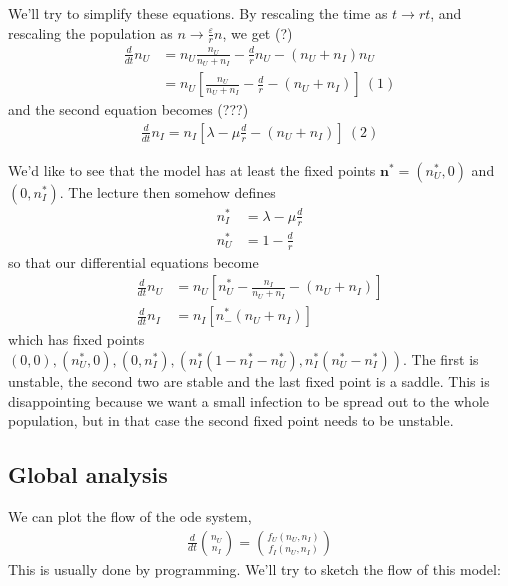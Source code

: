 \documentclass[a4paper]{article}
\begin{document}
We'll try to simplify these equations. By rescaling the time as $t \to rt$, and rescaling the population as $n \to \frac{\varepsilon}{r} n$, we get (?)
\begin{equation*}
\begin{aligned}
\frac{d}{dt} n_U &= n_U \frac{n_U}{n_U + n_I} - \frac{d}{r} n_U - (n_U+n_I) n_U\\
&= n_U\left[\frac{n_U}{n_U+n_I} - \frac{d}{r} - (n_U+n_I)\right] \ (1)
\end{aligned}
\end{equation*}
and the second equation becomes (???)
\begin{equation*}
\begin{aligned}
\frac{d}{dt} n_I = n_I \left[\lambda - \mu \frac{d}{r} - (n_U+n_I)\right] \ (2)
\end{aligned}
\end{equation*}

We'd like to see that the model has at least the fixed points $\mathbf{n}^* = (n^*_U,0)$ and $(0,n^*_I)$. The lecture then somehow defines
\begin{equation*}
\begin{aligned}
n^*_I &= \lambda - \mu \frac{d}{r}\\
n^*_U &= 1-\frac{d}{r}
\end{aligned}
\end{equation*}
so that our differential equations become
\begin{equation*}
\begin{aligned}
\frac{d}{dt} n_U &= n_U \left[n^*_U - \frac{n_I}{n_U+n_I} - (n_U+n_I)\right]\\
\frac{d}{dt} n_I &= n_I \left[n^*_ - (n_U+n_I)\right]
\end{aligned}
\end{equation*}
which has fixed points $(0,0),(n^*_U,0),(0,n^*_I),(n^*_I(1-n^*_I-n^*_U),n^*_I(n^*_U-n^*_I))$. The first is unstable, the second two are stable and the last fixed point is a saddle. This is disappointing because we want a small infection to be spread out to the whole population, but in that case the second fixed point needs to be unstable.

\subsection{Global analysis}
We can plot the flow of the ode system,
\begin{equation*}
\begin{aligned}
\frac{d}{dt} {n_U \choose n_I} = {{f_U(n_U,n_I)} \choose {f_I(n_U,n_I)}}
\end{aligned}
\end{equation*}
This is usually done by programming. We'll try to sketch the flow of this model:
\end{document}
